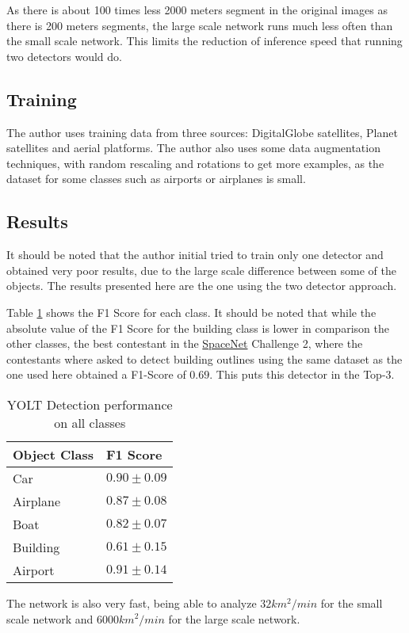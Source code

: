 As there is about 100 times less 2000 meters segment in the original images as there is 200 meters segments, the large scale network runs much less often than the small scale network. This limits the reduction of inference speed that running two detectors would do.

\subsection{Training}
The author uses training data from three sources: DigitalGlobe satellites, Planet satellites and aerial platforms. The author also uses some data augmentation techniques, with random rescaling and rotations to get more examples, as the dataset for some classes such as airports or airplanes is small.

\subsection{Results}
It should be noted that the author initial tried to train only one detector and obtained very poor results, due to the large scale difference between some of the objects. The results presented here are the one using the two detector approach.

Table \ref{tab:yoltResults} shows the F1 Score for each class. It should be noted that while the absolute value of the F1 Score for the building class is lower in comparison the other classes, the best contestant in the \href{https://spacenetchallenge.github.io/}{SpaceNet} Challenge 2, where the contestants where asked to detect building outlines using the same dataset as the one used here obtained a F1-Score of $0.69$. This puts this detector in the Top-3.
\begin{table}[h!]
\centering
\begin{tabular}{ll}
Object Class & F1 Score        \\ \hline
Car          & $0.90 \pm 0.09$ \\
Airplane     & $0.87 \pm 0.08$ \\
Boat         & $0.82 \pm 0.07$ \\
Building     & $0.61 \pm 0.15$ \\
Airport      & $0.91 \pm 0.14$ \\ \bottomrule
\end{tabular}
\caption{YOLT Detection performance on all classes}
\label{tab:yoltResults}
\end{table}

The network is also very fast, being able to analyze $32 km^2/min$ for the small scale network and $6000 km^2/min$ for the large scale network.

